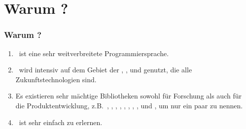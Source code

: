 \documentclass[aspectratio=169,mathserif,notheorems]{beamer}%
\begin{document}
\section{Warum \python?}%
%
\begin{frame}[t]%
\frametitle{Warum \python?}%
\begin{enumerate}%
\item \python\ ist eine sehr weitverbreitete Programmiersprache\cite{CBST2024LOHPPTDDSAMLA,B2023G2GLS}.%
%
\item<5-> \python\ wird intensiv auf dem Gebiet der \cite{RN2022AIAMA}, \cite{SSBD2014UMLFTTA}, und \cite{G2019DSFSFPWP} genutzt, die alle Zukunftstechnologien sind.%
%
\item<6-> Es existieren sehr mächtige Bibliotheken sowohl für Forschung als auch für die Produktentwicklung, z.B.~\numpy\cite{HMvdWGVCWTBSKPHvKBHFdRWPGMSRWAGO2020APWN,DBvR2024ITN,J2018NPSCADSAWNSAM}, \pandas\cite{B2012DPWP,L2024PW}, \scikitlearn\cite{PVGMTGBPWDVPCBPD2011SMLIP,RLM2022MLWPAS}, \scipy\cite{VGOHRCBPWBvdWBWMMNJKLCPFMVLPCHQHARPvMS2020SFAFSCIP,J2018NPSCADSAWNSAM}, \tensorflow\cite{ABCCDDDGIIKLMMMSTVWWYZ2016TASFLSML,L2023TDDBTADMLMWT}, \pytorch\cite{PGMLBCKLGADKYDRTCSFBC2019PAISHPDLL,RLM2022MLWPAS}, \matplotlib\cite{H2007MA2GE,P2021HOMLPAVWP,J2018NPSCADSAWNSAM}, \simpy\cite{Z2024DESIEWS}, und \moptipy\cite{WW2023RSDEWASSAA}, um nur ein paar zu nennen.%
%
\item<7-> \python\ ist sehr einfach zu erlernen\cite{GPBS2006WCTIPIHSUP,VR1999CPFERPASEFTPOT}.%
%
\end{enumerate}%
%
%
\end{frame}%
%
%
\end{document}
